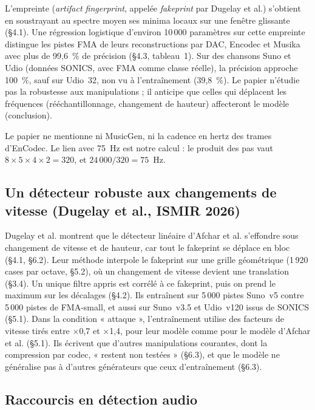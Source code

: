 \documentclass[a4paper, 11pt]{article}
\begin{document}
L'empreinte (\emph{artifact fingerprint}, appelée \emph{fakeprint} par Dugelay et al.) s'obtient en soustrayant
au spectre moyen ses minima locaux sur une fenêtre glissante (§4.1). Une régression logistique d'environ 10\,000
paramètres sur cette empreinte distingue les pistes FMA de leurs reconstructions par DAC, Encodec et Musika avec
plus de 99,6~\% de précision (§4.3, tableau~1). Sur des chansons Suno et Udio (données SONICS, avec FMA comme
classe réelle), la précision approche 100~\%, sauf sur Udio~32, non vu à l'entraînement (39,8~\%). Le papier
n'étudie pas la robustesse aux manipulations ; il anticipe que celles qui déplacent les fréquences
(rééchantillonnage, changement de hauteur) affecteront le modèle (conclusion).

Le papier ne mentionne ni MusicGen, ni la cadence en hertz des trames d'EnCodec. Le lien avec 75~Hz est notre
calcul : le produit des pas vaut $8 \times 5 \times 4 \times 2 = 320$, et $24\,000 / 320 = 75$~Hz.

\subsection{Un détecteur robuste aux changements de vitesse (Dugelay et al., ISMIR 2026)}

Dugelay et al. \cite{dugelay2026robustness} montrent que le détecteur linéaire d'Afchar et al. s'effondre sous
changement de vitesse et de hauteur, car tout le fakeprint se déplace en bloc (§4.1, §6.2). Leur méthode
interpole le fakeprint sur une grille géométrique (1\,920 cases par octave, §5.2), où un changement de vitesse
devient une translation (§3.4). Un unique filtre appris est corrélé à ce fakeprint, puis on prend le maximum
sur les décalages (§4.2). Ils entraînent sur 5\,000 pistes Suno~v5 contre 5\,000 pistes de FMA-small, et aussi
sur Suno~v3.5 et Udio~v120 issus de SONICS (§5.1). Dans la condition « attaque », l'entraînement utilise des
facteurs de vitesse tirés entre $\times$0,7 et $\times$1,4, pour leur modèle comme pour le modèle d'Afchar et
al. (§5.1). Ils écrivent que d'autres manipulations courantes, dont la compression par codec, « restent non
testées » (§6.3), et que le modèle ne généralise pas à d'autres générateurs que ceux d'entraînement (§6.3).

\subsection{Raccourcis en détection audio}
\end{document}
